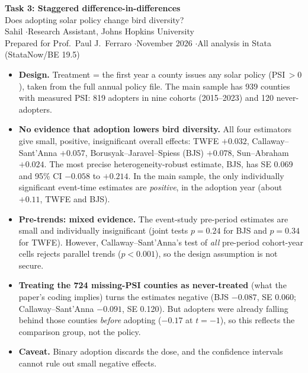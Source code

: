 \documentclass[11pt]{article}
\begin{document}
\begin{center}
{\LARGE\bfseries Task 3: Staggered difference-in-differences}\\[6pt]
{\large Does adopting solar policy change bird diversity?}\\[8pt]
Sahil \quad$\cdot$\quad Research Assistant, Johns Hopkins University\\
{\small Prepared for Prof.\ Paul J.\ Ferraro \quad$\cdot$\quad November 2026 \quad$\cdot$\quad All analysis in Stata (StataNow/BE 19.5)}
\end{center}

\begin{summarybox}
\small
\begin{itemize}[leftmargin=12pt]
\item \textbf{Design.} Treatment = the first year a county issues any solar policy (PSI\,$>0$), taken from the full annual policy file. The main sample has 939 counties with measured PSI: 819 adopters in nine cohorts (2015--2023) and 120 never-adopters.
\item \textbf{No evidence that adoption lowers bird diversity.} All four estimators give small, positive, insignificant overall effects: TWFE $+0.032$, Callaway--Sant'Anna $+0.057$, Borusyak--Jaravel--Spiess (BJS) $+0.078$, Sun--Abraham $+0.024$. The most precise heterogeneity-robust estimate, BJS, has SE 0.069 and 95\% CI $-0.058$ to $+0.214$. In the main sample, the only individually significant event-time estimates are \emph{positive}, in the adoption year (about $+0.11$, TWFE and BJS).
\item \textbf{Pre-trends: mixed evidence.} The event-study pre-period estimates are small and individually insignificant (joint tests $p=0.24$ for BJS and $p=0.34$ for TWFE). However, Callaway--Sant'Anna's test of \emph{all} pre-period cohort-year cells rejects parallel trends ($p<0.001$), so the design assumption is not secure.
\item \textbf{Treating the 724 missing-PSI counties as never-treated} (what the paper's coding implies) turns the estimates negative (BJS $-0.087$, SE 0.060; Callaway--Sant'Anna $-0.091$, SE 0.120). But adopters were already falling behind those counties \emph{before} adopting ($-0.17$ at $t=-1$), so this reflects the comparison group, not the policy.
\item \textbf{Caveat.} Binary adoption discards the dose, and the confidence intervals cannot rule out small negative effects.
\end{itemize}
\end{summarybox}
\end{document}
